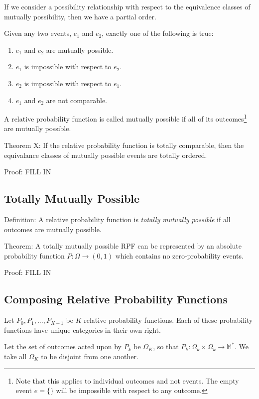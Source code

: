 \documentclass[twoside]{article}
\begin{document}
If we consider a possibility relationship with respect to the equivalence classes of mutually possibility, then we have a partial order.

Given any two events, \(e_1\) and \(e_2\), exactly one of the following is true:
\begin{enumerate}
  \item \(e_1\) and \(e_2\) are mutually possible.
  \item \(e_1\) is impossible with respect to \(e_2\).
  \item \(e_2\) is impossible with respect to \(e_1\).
  \item \(e_1\) and \(e_2\) are not comparable.
\end{enumerate}

A relative probability function is called mutually possible if all of its outcomes\footnote{Note that this applies to individual outcomes and not events. The empty event \(e = \{\}\) will be impossible with respect to any outcome.} are mutually possible.

Theorem X: If the relative probability function is totally comparable, then the equivalance classes of mutually possible events are totally ordered.

Proof: FILL IN

\subsection{Totally Mutually Possible}

Definition: A relative probability function is \textit{totally mutually possible} if all outcomes are mutually possible.

Theorem: A totally mutually possible RPF can be represented by an absolute probability function \(P: \Omega \rightarrow (0, 1)\) which contains no zero-probability events.

Proof: FILL IN

\subsection{Composing Relative Probability Functions}

Let \(P_0, P_1, ..., P_{K-1}\) be \(K\) relative probability functions. Each of these probability functions have unique categories in their own right.

Let the set of outcomes acted upon by \(P_k\) be \(\Omega_K\), so that \(P_k: \Omega_k \times \Omega_k \rightarrow \mathbb{M}^{\ast}\). We take all \(\Omega_K\) to be disjoint from one another.
\end{document}
